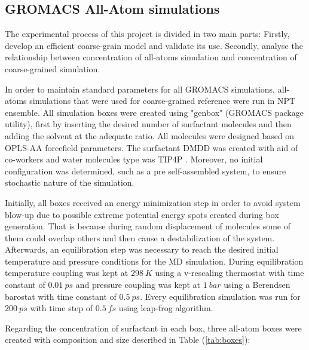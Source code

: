 \documentclass[10pt,a4paper,twoside]{article}
\begin{document}
\subsection{GROMACS All-Atom simulations}
The experimental process of this project is divided in two main parts: Firstly, develop an efficient coarse-grain model and validate its use. Secondly, analyse the relationship between concentration  of all-atoms simulation and concentration of coarse-grained simulation.

In order to maintain standard parameters for all GROMACS simulations, all-atoms simulations that were used for coarse-grained reference were run in NPT ensemble. All simulation boxes were created using "genbox" (GROMACS package utility), first by inserting the desired number of surfactant molecules and then adding the solvent at the adequate ratio. All molecules were designed based on OPLS-AA forcefield \cite{opls} parameters. %
The surfactant DMDD was created with aid of co-workers and water molecules type was TIP4P \cite{tip4p}. %
Moreover, no initial configuration was determined, such as a pre self-assembled system, to ensure stochastic nature of the simulation.  

Initially, all boxes received an energy minimization step in order to avoid system blow-up due to possible extreme potential energy spots created during box generation. That is because during random displacement of molecules some of them could overlap others and then cause a destabilization of the system. Afterwards, an equilibration step was necessary to reach the desired initial temperature and pressure conditions for the MD simulation. During equilibration temperature coupling was kept at $298\ K$ using a v-rescaling thermostat \cite{vtstat} with time constant of $0.01\ ps$ and pressure coupling was kept at $1\ bar$ using a Berendsen barostat \cite{bbstat} with time constant of $0.5\ ps$.  Every equilibration simulation was run for $200\ ps$ with time step of $0.5\ fs$ using leap-frog algorithm.

Regarding the concentration of surfactant in each box, three all-atom boxes were created with composition and size described in Table (\ref{tab:boxes}):
\end{document}
